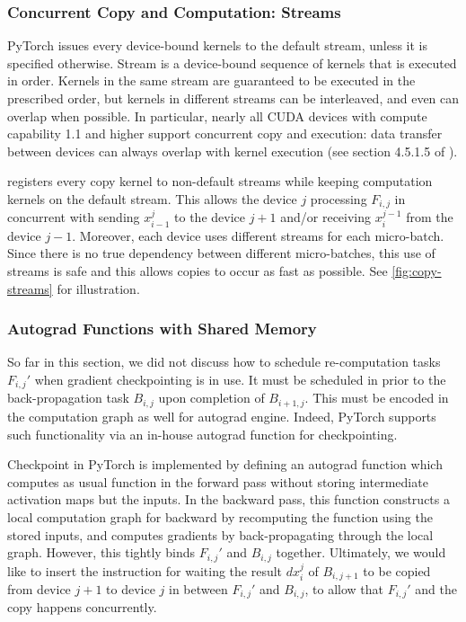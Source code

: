 \subsubsection{Concurrent Copy and Computation: Streams}
\label{subsubsec:copy-streams}

PyTorch issues every device-bound kernels to the default stream, unless it is specified otherwise. Stream is a device-bound sequence of kernels that is executed in order. Kernels in the same stream are guaranteed to be executed in the prescribed order, but kernels in different streams can be interleaved, and even can overlap when possible. In particular, nearly all CUDA devices with compute capability 1.1 and higher support concurrent copy and execution: data transfer between devices can always overlap with kernel execution (see section 4.5.1.5 of \cite{nvidia2007cuda}).

{\torchgpipe} registers every copy kernel to non-default streams while keeping computation kernels on the default stream. This allows the device $j$ processing $F_{i, j}$ in concurrent with sending $x_{i-1}^j$ to the device $j+1$ and/or receiving $x_{i}^{j-1}$ from the device $j-1$. Moreover, each device uses different streams for each micro-batch. Since there is no true dependency between different micro-batches, this use of streams is safe and this allows copies to occur as fast as possible. See \autoref{fig:copy-streams} for illustration.


\subsubsection{Autograd Functions with Shared Memory}
\label{subsubsec:checkpointing}
So far in this section, we did not discuss how to schedule re-computation tasks $F_{i,j}'$ when gradient checkpointing is in use. It must be scheduled in prior to the back-propagation task $B_{i, j}$ upon completion of $B_{i+1, j}$. This must be encoded in the computation graph as well for autograd engine. Indeed, PyTorch supports such functionality via an in-house autograd function for checkpointing.

Checkpoint in PyTorch is implemented by defining an autograd function which computes as usual function in the forward pass without storing intermediate activation maps but the inputs. In the backward pass, this function constructs a local computation graph for backward by recomputing the function using the stored inputs, and computes gradients by back-propagating through the local graph. However, this tightly binds $F_{i,j}'$ and $B_{i,j}$ together. Ultimately, we would like to insert the instruction for waiting the result $dx_i^{j}$ of $B_{i, j+1}$ to be copied from device $j+1$ to device $j$ in between $F_{i,j}'$ and $B_{i,j}$, to allow that $F_{i,j}'$ and the copy happens concurrently.


